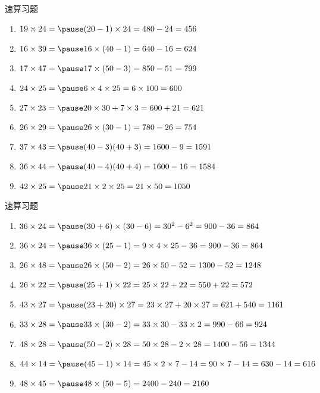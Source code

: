 \documentclass[aspectratio=169]{ctexbeamer} %
\date{\today}
\begin{document}
\begin{frame}[t]{速算习题}
\begin{spacing}{1.2}
\normalsize
\begin{enumerate}[label={\arabic*.}]
\item $ 19 \times 24 = \pause (20-1) \times 24 = 480 - 24 = 456$
\item $ 16 \times 39 = \pause 16 \times (40-1) = 640 - 16 = 624$
\item $ 17 \times 47 = \pause 17 \times (50-3) = 850 - 51 = 799$
\item $ 24 \times 25 = \pause 6 \times 4 \times 25 = 6 \times 100 = 600$
\item $ 27 \times 23 = \pause 20 \times 30 + 7 \times 3 = 600 + 21 = 621$
\item $ 26 \times 29 = \pause 26 \times (30-1) = 780 - 26 = 754$
\item $ 37 \times 43 = \pause (40-3)(40+3) = 1600 - 9 = 1591$
\item $ 36 \times 44 = \pause (40-4)(40+4) = 1600 - 16 = 1584$
\item $ 42 \times 25 = \pause 21 \times 2 \times 25 = 21 \times 50 = 1050$
\end{enumerate}

\end{spacing}
\end{frame}

\begin{frame}[t]{速算习题}
\begin{spacing}{1.2}
\normalsize
\begin{enumerate}[label={\arabic*.}]
\item $ 36 \times 24 = \pause (30+6) \times (30-6) = 30^2 - 6^2 = 900 - 36 = 864$
\item $ 36 \times 24 = \pause 36 \times (25-1) = 9 \times 4 \times 25 - 36 = 900 - 36 = 864$
\item $ 26 \times 48 = \pause 26 \times (50-2) = 26 \times 50 - 52 = 1300 - 52 = 1248$
\item $ 26 \times 22 = \pause (25+1) \times 22 = 25 \times 22 + 22 = 550 + 22 = 572$
\item $ 43 \times 27 = \pause (23+20) \times 27 = 23 \times 27 + 20 \times 27 = 621 + 540 = 1161$
\item $ 33 \times 28 = \pause 33 \times (30-2) = 33 \times 30 - 33 \times 2 = 990 - 66 = 924$
\item $ 48 \times 28 = \pause (50-2) \times 28 = 50 \times 28 - 2 \times 28 = 1400 - 56 = 1344$
\item $ 44 \times 14 = \pause (45-1) \times 14 = 45 \times 2 \times 7 - 14 = 90 \times 7 - 14 = 630 - 14 = 616$
\item $ 48 \times 45 = \pause 48 \times (50 - 5) = 2400 - 240 = 2160$
\end{enumerate}

\end{spacing}
\end{frame}
\end{document}

